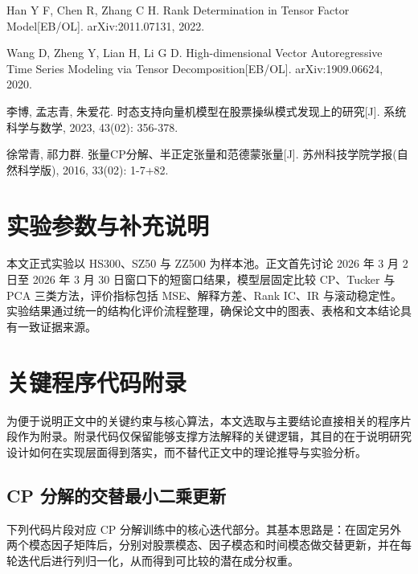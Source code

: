 \begin{enumerate}[label={[\arabic*]}]
  \item Han Y F, Chen R, Zhang C H. Rank Determination in Tensor Factor Model[EB/OL]. arXiv:2011.07131, 2022.
  \item Wang D, Zheng Y, Lian H, Li G D. High-dimensional Vector Autoregressive Time Series Modeling via Tensor Decomposition[EB/OL]. arXiv:1909.06624, 2020.
  \item 李博, 孟志青, 朱爱花. 时态支持向量机模型在股票操纵模式发现上的研究[J]. 系统科学与数学, 2023, 43(02): 356-378.
  \item 徐常青, 祁力群. 张量CP分解、半正定张量和范德蒙张量[J]. 苏州科技学院学报(自然科学版), 2016, 33(02): 1-7+82.
\end{enumerate}

\appendix
\chapter{实验参数与补充说明}

本文正式实验以 HS300、SZ50 与 ZZ500 为样本池。正文首先讨论 2026 年 3 月 2 日至 2026 年 3 月 30 日窗口下的短窗口结果，模型层固定比较 CP、Tucker 与 PCA 三类方法，评价指标包括 MSE、解释方差、Rank IC、IR 与滚动稳定性。实验结果通过统一的结构化评价流程整理，确保论文中的图表、表格和文本结论具有一致证据来源。

\chapter{关键程序代码附录}

为便于说明正文中的关键约束与核心算法，本文选取与主要结论直接相关的程序片段作为附录。附录代码仅保留能够支撑方法解释的关键逻辑，其目的在于说明研究设计如何在实现层面得到落实，而不替代正文中的理论推导与实验分析。

\section{CP 分解的交替最小二乘更新}

下列代码片段对应 CP 分解训练中的核心迭代部分。其基本思路是：在固定另外两个模态因子矩阵后，分别对股票模态、因子模态和时间模态做交替更新，并在每轮迭代后进行列归一化，从而得到可比较的潜在成分权重。

